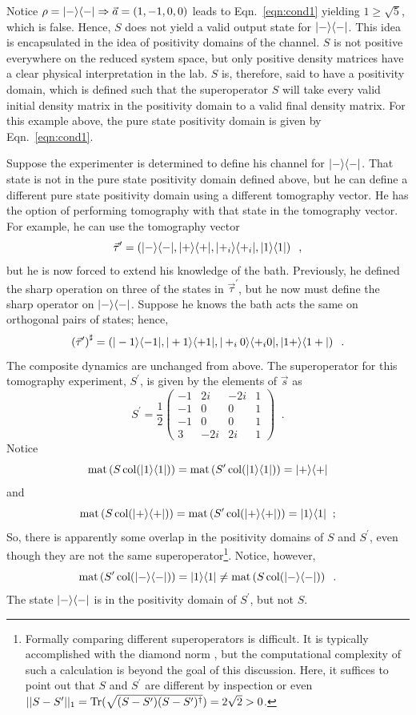 Notice $\rho=|-\rangle\langle-|\Rightarrow\vec{a}=(1,-1,0,0)$ leads to Eqn.\ \ref{eqn:cond1} yielding $1\ge\sqrt{5}$, which is false.  Hence, $S$ does not yield a valid output state for $|-\rangle\langle-|$.  This idea is encapsulated in the idea of positivity domains of the channel.  $S$ is not positive everywhere on the reduced system space, but only positive density matrices have a clear physical interpretation in the lab.  $S$ is, therefore, said to have a positivity domain, which is defined such that the superoperator $S$ will take every valid initial density matrix in the positivity domain to a valid final density matrix.  For this example above, the pure state positivity domain is given by Eqn.\ \ref{eqn:cond1}.

Suppose the experimenter is determined to define his channel for $|-\rangle\langle-|$.  That state is not in the pure state positivity domain defined above, but he can define a different pure state positivity domain using a different tomography vector.  He has the option of performing tomography with that state in the tomography vector.  For example, he can use the tomography vector
$$
\vec{\tau}^\prime = \left(|-\rangle\langle-|,|+\rangle\langle+|,|+_i\rangle\langle+_i|,|1\rangle\langle1|\right)\;\;,
$$
but he is now forced to extend his knowledge of the bath.  Previously, he defined the sharp operation on three of the states in $\vec{\tau}^\prime$, but he now must define the sharp operator on $|-\rangle\langle-|$.  Suppose he knows the bath acts the same on orthogonal pairs of states; hence,
$$
\left(\vec{\tau}^\prime\right)^\sharp = \left(|-1\rangle\langle-1|,|+1\rangle\langle+1|,|+_i0\rangle\langle+_i0|,|1+\rangle\langle1+|\right)\;\;.
$$
The composite dynamics are unchanged from above.  The superoperator for this tomography experiment, $S^\prime$, is given by the elements of $\vec{s}$ as
$$
S^\prime = \frac{1}{2}\begin{pmatrix}
-1&2i&-2i&1\\
-1&0&0&1\\
-1&0&0&1\\
3&-2i&2i&1
\end{pmatrix}\;\;.
$$
Notice
$$
\operatorname{mat}\left(S\operatorname{col}(|1\rangle\langle1|)\right) = \operatorname{mat}\left(S^\prime\operatorname{col}(|1\rangle\langle1|)\right) = |+\rangle\langle+|
$$
and
$$
\operatorname{mat}\left(S\operatorname{col}(|+\rangle\langle+|)\right) = \operatorname{mat}\left(S^\prime\operatorname{col}(|+\rangle\langle+|)\right) = |1\rangle\langle1|\;\;;
$$
So, there is apparently some overlap in the positivity domains of $S$ and $S^\prime$, even though they are not the same superoperator\footnote{Formally comparing different superoperators is difficult.  It is typically accomplished with the diamond norm \cite{Kitaev1998}, but the computational complexity of such a calculation is beyond the goal of this discussion.  Here, it suffices to point out that $S$ and $S^\prime$ are different by inspection or even $||S-S^\prime||_1 = \operatorname{Tr}(\sqrt{(S-S^\prime)(S-S^\prime)^\dagger}) = 2\sqrt{2} >0$.}.  Notice, however,
$$
\operatorname{mat}\left(S^\prime \operatorname{col}(|-\rangle\langle-|)\right) = |1\rangle\langle1| \neq \operatorname{mat}\left(S \operatorname{col}(|-\rangle\langle-|)\right)\;\;.
$$
The state $|-\rangle\langle-|$ is in the positivity domain of $S^\prime$, but not $S$.

